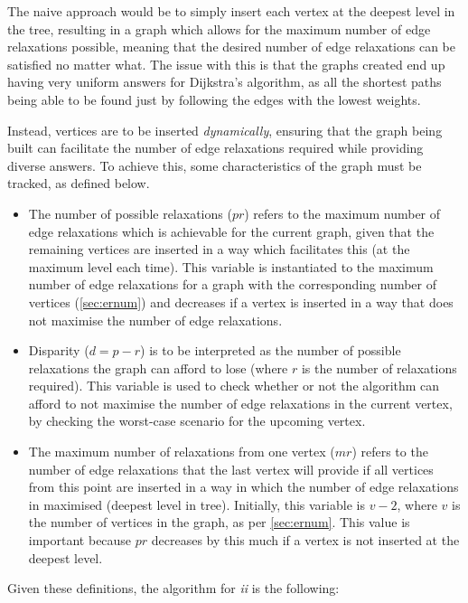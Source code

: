 \documentclass{l4proj}
\begin{document}
The naive approach would be to simply insert each vertex at the deepest level in the tree, resulting in a graph which allows for the maximum number of edge relaxations possible, meaning that the desired number of edge relaxations can be satisfied no matter what. The issue with this is that the graphs created end up having very uniform answers for Dijkstra's algorithm, as all the shortest paths being able to be found just by following the edges with the lowest weights.

Instead, vertices are to be inserted \emph{dynamically}, ensuring that the graph being built can facilitate the number of edge relaxations required while providing diverse answers. To achieve this, some characteristics of the graph must be tracked, as defined below.

\begin{itemize}
	\item
	The number of possible relaxations ($pr$) refers to the maximum number of edge relaxations which is achievable for the current graph, given that the remaining vertices are inserted in a way which facilitates this (at the maximum level each time). This variable is instantiated to the maximum number of edge relaxations for a graph with the corresponding number of vertices (\autoref{sec:ernum}) and decreases if a vertex is inserted in a way that does not maximise the number of edge relaxations. 
	\item
	Disparity ($d = p - r$) is to be interpreted as the number of possible relaxations the graph can afford to lose (where $r$ is the number of relaxations required). This variable is used to check whether or not the algorithm can afford to not maximise the number of edge relaxations in the current vertex, by checking the worst-case scenario for the upcoming vertex.
	\item
	The maximum number of relaxations from one vertex ($mr$) refers to the number of edge relaxations that the last vertex will provide if all vertices from this point are inserted in a way in which the number of edge relaxations in maximised (deepest level in tree). Initially, this variable is $v-2$, where $v$ is the number of vertices in the graph, as per \autoref{sec:ernum}. This value is important because $pr$ decreases by this much if a vertex is not inserted at the deepest level.
\end{itemize}

Given these definitions, the algorithm for \emph{ii} is the following:
\end{document}
